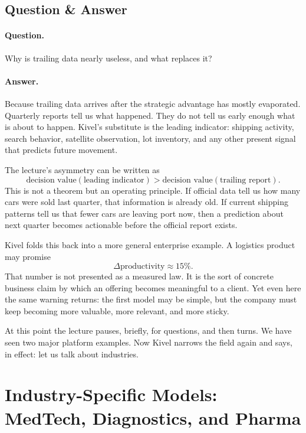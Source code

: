 \subsection{Question \& Answer}

\paragraph{Question.} Why is trailing data nearly useless, and what replaces it?

\paragraph{Answer.} Because trailing data arrives after the strategic advantage has mostly evaporated. Quarterly reports tell us what happened. They do not tell us early enough what is about to happen. Kivel's substitute is the leading indicator: shipping activity, search behavior, satellite observation, lot inventory, and any other present signal that predicts future movement.

The lecture's asymmetry can be written as
\begin{equation}
\text{decision value}(\text{leading indicator})
>
\text{decision value}(\text{trailing report}).
\end{equation}
This is not a theorem but an operating principle. If official data tell us how many cars were sold last quarter, that information is already old. If current shipping patterns tell us that fewer cars are leaving port now, then a prediction about next quarter becomes actionable before the official report exists.

Kivel folds this back into a more general enterprise example. A logistics product may promise
\begin{equation}
\Delta \text{productivity} \approx 15\%.
\end{equation}
That number is not presented as a measured law. It is the sort of concrete business claim by which an offering becomes meaningful to a client. Yet even here the same warning returns: the first model may be simple, but the company must keep becoming more valuable, more relevant, and more sticky.

At this point the lecture pauses, briefly, for questions, and then turns. We have seen two major platform examples. Now Kivel narrows the field again and says, in effect: let us talk about industries.

\section{Industry-Specific Models: MedTech, Diagnostics, and Pharma}

